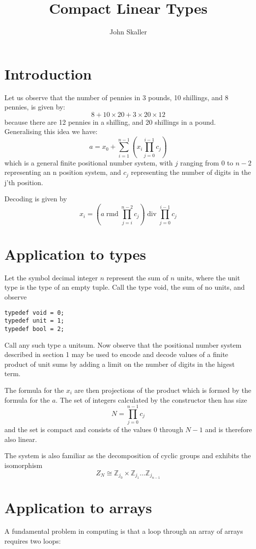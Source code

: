 \documentclass{article}
\title{Compact Linear Types}
\author{John Skaller}
\DeclareMathOperator{\quot}{div}
\DeclareMathOperator{\rmd}{rmd}
\begin{document}
\maketitle
\section{Introduction}
Let us observe that the number of pennies in 3 pounds, 10 shillings, and 8 
pennies, is given by:
$$8 + 10 \times 20 + 3 \times 20 \times 12$$
because there are 12 pennies in a shilling, and 20 shillings in a pound.
Generalising this idea we have:
$$a=x_0+\sum_{i=1}^{n-1} (x_i \prod^{i-1}_{j=0} c_j)$$
which is a general finite positional number system, with $j$ ranging from 0 to $n-2$ 
representing an n position system, and $c_j$ representing the number of digits
in the j'th position.

Decoding is given by 
$$x_i = (a \rmd \prod^{n-2}_{j=i} c_j) \quot \prod^{i-1}_{j=0} c_j$$

\section{Application to types}
Let the symbol decimal integer $n$ represent the sum of $n$ units,
where the unit type is the type of an empty tuple. Call the
type void, the sum of no units, and observe

\begin{verbatim}
typedef void = 0;
typedef unit = 1;
typedef bool = 2;
\end{verbatim}

Call any such type a unitsum. Now observe that the positional number
system described in section 1 may be used to encode and decode 
values of a finite product of unit sums by adding a limit on the
number of digits in the higest term.

The formula for the $x_i$ are then projections of the product
which is formed by the formula for the $a$. The set of integers
calculated by the constructor then has size
$$N=\prod_{j=0}^{n-1}c_j$$
and the set is compact and consists of the values 0 through $N-1$
and is therefore also linear.

The system is also familiar as the decomposition of cyclic groups
and exhibits the isomorphism
$$Z_N \cong {\mathbb Z}_{j_0} \times {\mathbb Z}_{j_1} \ldots {\mathbb Z}_{j_{n-1}}$$

\section{Application to arrays}
A fundamental problem in computing is that a loop
through an array of arrays requires two loops:
\end{document}
